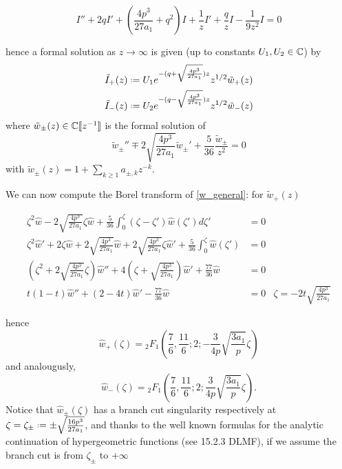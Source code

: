 \documentclass[11pt,a4paper,twoside,leqno,noamsfonts]{amsart}
\numberwithin{equation}{section}
\begin{document}
\begin{equation}
I''+2qI'+\left(\frac{4p^3}{27a_1}+q^2\right)I+\frac{1}{z}I'+\frac{q}{z}I-\frac{1}{9z^2}I=0
\end{equation}

hence a formal solution as $z\to \infty$ is given (up to constants $U_1,U_2\in\mathbb C$) by 
\begin{align}
\tilde{I}_{+}(z)&\defeq U_1e^{-(q+\sqrt{\frac{4p^3}{27a_1}})z}z^{1/2}\tilde{w}_+(z)\\
\tilde{I}_-(z)&\defeq U_2 e^{-(q-\sqrt{\frac{4p^3}{27a_1}})z}z^{1/2}\tilde{w}_-(z)
\end{align}
where $\tilde{w}_{\pm}(z)\in\mathbb C[\![z^{-1}]\!]$ is the formal solution of
\begin{equation}\label{w_general}
\tilde{w}_{\pm}''\mp 2\sqrt{\frac{4p^3}{27a_1}}\tilde{w}_{\pm}'+\frac{5}{36}\frac{\tilde{w}_{\pm}}{z^2}=0
\end{equation}
with $\tilde{w}_{\pm}(z)=1+\sum_{k\geq 1}a_{\pm,k}z^{-k}$.

We can now compute the Borel transform of \eqref{w_general}: for $\tilde{w}_+(z)$

\begin{align*}
\zeta^2\hat{w}-2\sqrt{\frac{4p^3}{27a_1}}\zeta\hat{w}+\frac{5}{36}\int_0^{\zeta}(\zeta-\zeta')\hat{w}(\zeta')d\zeta'&=0 &\\
\zeta^2\hat{w}'+2\zeta\hat{w}+2\sqrt{\frac{4p^3}{27a_1}}\hat{w}+2\sqrt{\frac{4p^3}{27a_1}}\zeta\hat{w}'+\frac{5}{36}\int_0^\zeta\hat{w}(\zeta')&=0 &\\
\left(\zeta^2+2\sqrt{\frac{4p^3}{27a_1}}\zeta\right)\hat{w}''+4\left(\zeta+\sqrt{\frac{4p^3}{27a_1}}\right)\hat{w}'+\frac{77}{36}\hat{w}&=0 &\\
t(1-t)\hat{w}''+(2-4t)\hat{w}'-\frac{77}{36}\hat{w}&=0 &\zeta=-2t\sqrt{\frac{4p^3}{27a_1}}
\end{align*}

hence \[\hat{w}_+(\zeta)={}_2F_1\left(\frac{7}{6},\frac{11}{6};2;-\frac{3}{4p}\sqrt{\frac{3a_1}{p}}\zeta\right)\] and analougusly, \[\hat{w}_-(\zeta)={}_2F_1\left(\frac{7}{6},\frac{11}{6};2;\frac{3}{4p}\sqrt{\frac{3a_1}{p}}\zeta\right).\] Notice that $\hat{w}_{\pm}(\zeta)$ has a branch cut singularity respectively at $\zeta=\zeta_{\pm}\defeq\pm \sqrt{\frac{16p^3}{27a_1}}$, and thanks to the well known formulas for the analytic continuation of hypergeometric functions (see 15.2.3 DLMF), if we assume the branch cut is from $\zeta_{\pm}$ to $+\infty$
\end{document}
